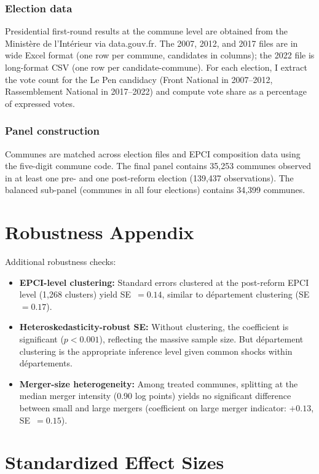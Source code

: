 \documentclass[12pt]{article}
\begin{document}
\subsubsection*{Election data} Presidential first-round results at the commune level are obtained from the Minist\`{e}re de l'Int\'{e}rieur via data.gouv.fr. The 2007, 2012, and 2017 files are in wide Excel format (one row per commune, candidates in columns); the 2022 file is long-format CSV (one row per candidate-commune). For each election, I extract the vote count for the Le Pen candidacy (Front National in 2007--2012, Rassemblement National in 2017--2022) and compute vote share as a percentage of expressed votes.

\subsubsection*{Panel construction} Communes are matched across election files and EPCI composition data using the five-digit commune code. The final panel contains 35,253 communes observed in at least one pre- and one post-reform election (139,437 observations). The balanced sub-panel (communes in all four elections) contains 34,399 communes.

\section{Robustness Appendix}

Additional robustness checks:

\begin{itemize}
\item \textbf{EPCI-level clustering:} Standard errors clustered at the post-reform EPCI level (1,268 clusters) yield SE~$= 0.14$, similar to d\'{e}partement clustering (SE~$= 0.17$).
\item \textbf{Heteroskedasticity-robust SE:} Without clustering, the coefficient is significant ($p < 0.001$), reflecting the massive sample size. But d\'{e}partement clustering is the appropriate inference level given common shocks within d\'{e}partements.
\item \textbf{Merger-size heterogeneity:} Among treated communes, splitting at the median merger intensity (0.90 log points) yields no significant difference between small and large mergers (coefficient on large merger indicator: $+0.13$, SE~$= 0.15$).
\end{itemize}

\section{Standardized Effect Sizes}
\label{sec:sde}


\end{document}
